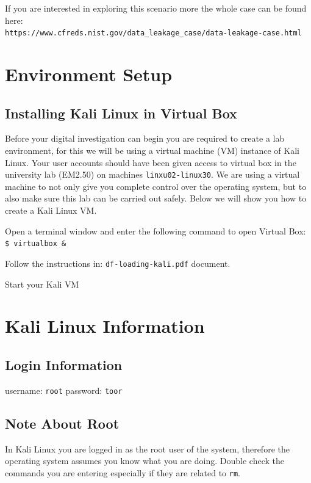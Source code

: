 \documentclass[a4paper,11pt]{article}
\begin{document}
 If you are interested in exploring this scenario more the whole case can be found here:\\
 \verb|https://www.cfreds.nist.gov/data_leakage_case/data-leakage-case.html|

\section{Environment Setup}
\subsection*{Installing Kali Linux in Virtual Box}
Before your digital investigation can begin you are required to create a lab environment, for this we will be using a virtual machine (VM) instance of Kali Linux.
Your user accounts should have been given access to virtual box in the university lab (EM2.50) on machines \texttt{linxu02-linux30}. We are using a virtual machine to not only give you complete control over the operating system, but to also make sure this lab can be carried out safely. Below we will show you how to create a Kali Linux VM.
	\begin{enumerate*}
	 \item Open a terminal window and enter the following command to open Virtual Box:\\
		\texttt{{\$}	virtualbox {\&}}
	\item Follow the instructions in: \texttt{df-loading-kali.pdf} document.
	\item Start your Kali VM
	\end{enumerate*}
	
\section{Kali Linux Information}
\subsection*{Login Information}
	 username: \texttt{root}
	 password: \texttt{toor}

\subsection*{Note About Root}
In Kali Linux you are logged in as the root user of the system, therefore the operating system assumes you know what you are doing. Double check the commands you are entering especially if they are related to \texttt{rm}.
\end{document}
